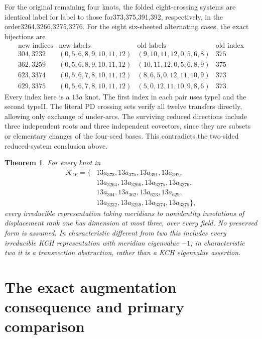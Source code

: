 \documentclass[11pt]{article}
\newtheorem{theorem}[lemma]{Theorem}
\begin{document}
For the original remaining four knots, the folded eight-crossing
systems are identical label for label to those for373,375,391,392,
respectively, in the order3264,3266,3275,3276.
For the eight six-sheeted alternating cases, the exact bijections are
\[
\begin{array}{c|c|c|c}
\text{new indices}&\text{new labels}&\text{old labels}&\text{old index}\\\hline
304,3232&(0,5,6,8,9,10,11,12)&(9,10,11,12,0,5,6,8)&375\\
362,3259&(0,5,6,8,9,10,11,12)&(10,11,12,0,5,6,8,9)&375\\
623,3374&(0,5,6,7,8,10,11,12)&(8,6,5,0,12,11,10,9)&373\\
629,3375&(0,5,6,7,8,10,11,12)&(5,0,12,11,10,9,8,6)&373.
\end{array}
\]
Every index here is a $13a$ knot. The first index in each pair uses
typeI and the second typeII. The literal PD crossing sets verify
all twelve transfers directly, allowing only exchange of under-arcs.
The surviving reduced directions include three independent roots
and three independent covectors, since they are subsets or elementary
changes of the four-seed bases. This contradicts the two-sided
reduced-system conclusion above.

\begin{theorem}\label{thm:sixteen}
For every knot in
\[
\begin{aligned}
\mathcal K_{16}=\{&13a_{373},13a_{375},13a_{391},13a_{392},\\
 &13a_{3264},13a_{3266},13a_{3275},13a_{3276},\\
 &13a_{304},13a_{362},13a_{623},13a_{629},\\
 &13a_{3232},13a_{3259},13a_{3374},13a_{3375}\},
\end{aligned}
\]
every irreducible representation taking meridians to nonidentity
involutions of displacement rank one has dimension at most three,
over every field. No preserved form is assumed. In characteristic
different from two this includes every irreducible KCH representation
with meridian eigenvalue $-1$; in characteristic two it is a
transvection obstruction, rather than a KCH eigenvalue assertion.
\end{theorem}

\section{The exact augmentation consequence and primary comparison}
\end{document}

